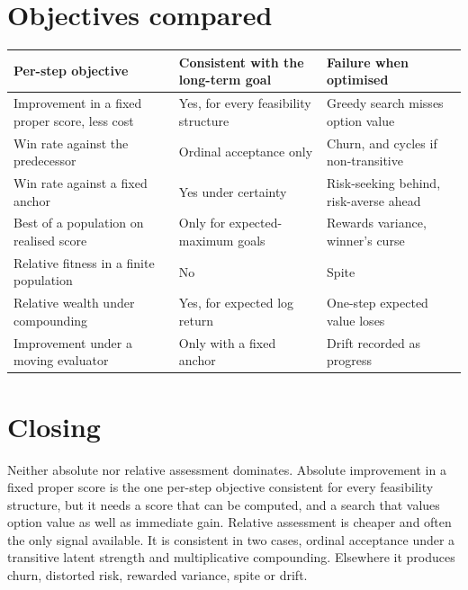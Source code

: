 \documentclass[11pt]{article}
\theoremstyle{definition}
\theoremstyle{remark}
\begin{document}
\section{Objectives compared}

\begin{center}
\small
\renewcommand{\arraystretch}{1.25}
\begin{tabular}{@{}>{\raggedright\arraybackslash}p{}>{\raggedright\arraybackslash}p{}>{\raggedright\arraybackslash}p{}@{}}
\toprule
Per-step objective & Consistent with the long-term goal & Failure when optimised \\
\midrule
Improvement in a fixed proper score, less cost & Yes, for every feasibility structure & Greedy search misses option value \\
Win rate against the predecessor & Ordinal acceptance only & Churn, and cycles if non-transitive \\
Win rate against a fixed anchor & Yes under certainty & Risk-seeking behind, risk-averse ahead \\
Best of a population on realised score & Only for expected-maximum goals & Rewards variance, winner's curse \\
Relative fitness in a finite population & No & Spite \\
Relative wealth under compounding & Yes, for expected log return & One-step expected value loses \\
Improvement under a moving evaluator & Only with a fixed anchor & Drift recorded as progress \\
\bottomrule
\end{tabular}
\end{center}

\section{Closing}

Neither absolute nor relative assessment dominates. Absolute improvement in a fixed proper score
is the one per-step objective consistent for every feasibility structure, but it needs a score
that can be computed, and a search that values option value as well as immediate gain.
Relative assessment is cheaper and often the only signal available. It is consistent in two
cases, ordinal acceptance under a transitive latent strength and multiplicative compounding.
Elsewhere it produces churn, distorted risk, rewarded variance, spite or drift.
\end{document}
